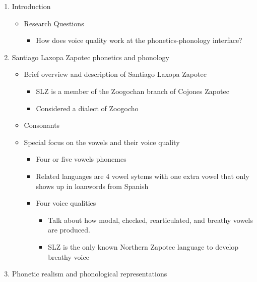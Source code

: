 \documentclass[12pt, letterpaper]{article}
\begin{document}
\begin{enumerate}
    \item Introduction
    \begin{itemize}
        \item Research Questions
        \begin{itemize}
            \item How does voice quality work at the phonetics-phonology interface?
        \end{itemize}
    \end{itemize}
    \item Santiago Laxopa Zapotec phonetics and phonology
    \begin{itemize}
        \item Brief overview and description of Santiago Laxopa Zapotec
        \begin{itemize}
            \item SLZ is a member of the Zoogochan branch of Cojones Zapotec
            \item Considered a dialect of Zoogocho \citep{smith-starkAlgunasIsoglosasZapotecas2003}
        \end{itemize}
        \item Consonants
        \item Special focus on the vowels and their voice quality
        \begin{itemize}
            \item Four or five vowels phonemes
            \item Related languages are 4 vowel sytems with one extra vowel that only shows up in loanwords from Spanish \citep{sonnenscheinDescriptiveGrammarSan2004,sonnenscheinDescriptiveGrammarSan2005, avelinobecerraTopicsYalalagZapotec2004}
            \item Four voice qualities
            \begin{itemize}
                \item Talk about how modal, checked, rearticulated, and breathy vowels are produced.
                \item SLZ is the only known Northern Zapotec language to develop breathy voice \citep[c.f.,][]{ariza-garciaPhonationTypesTones2018} 
            \end{itemize} 
        \end{itemize}
    \end{itemize}
    \item Phonetic realism and phonological representations
    \begin{itemize}

\end{itemize}
\end{enumerate}
\end{document}
